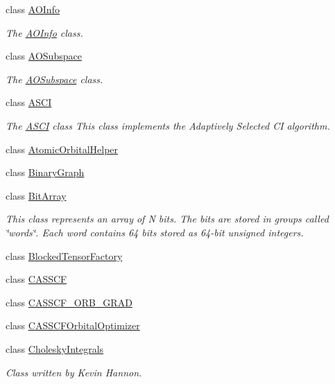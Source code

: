 \begin{DoxyCompactItemize}
class \mbox{\hyperlink{classforte_1_1_a_o_info}{A\+O\+Info}}
\begin{DoxyCompactList}\small\item\em The \mbox{\hyperlink{classforte_1_1_a_o_info}{A\+O\+Info}} class. \end{DoxyCompactList}\item 
class \mbox{\hyperlink{classforte_1_1_a_o_subspace}{A\+O\+Subspace}}
\begin{DoxyCompactList}\small\item\em The \mbox{\hyperlink{classforte_1_1_a_o_subspace}{A\+O\+Subspace}} class. \end{DoxyCompactList}\item 
class \mbox{\hyperlink{classforte_1_1_a_s_c_i}{A\+S\+CI}}
\begin{DoxyCompactList}\small\item\em The \mbox{\hyperlink{classforte_1_1_a_s_c_i}{A\+S\+CI}} class This class implements the Adaptively Selected CI algorithm. \end{DoxyCompactList}\item 
class \mbox{\hyperlink{classforte_1_1_atomic_orbital_helper}{Atomic\+Orbital\+Helper}}
\item 
class \mbox{\hyperlink{classforte_1_1_binary_graph}{Binary\+Graph}}
\item 
class \mbox{\hyperlink{classforte_1_1_bit_array}{Bit\+Array}}
\begin{DoxyCompactList}\small\item\em This class represents an array of N bits. The bits are stored in groups called \char`\"{}words\char`\"{}. Each word contains 64 bits stored as 64-\/bit unsigned integers. \end{DoxyCompactList}\item 
class \mbox{\hyperlink{classforte_1_1_blocked_tensor_factory}{Blocked\+Tensor\+Factory}}
\item 
class \mbox{\hyperlink{classforte_1_1_c_a_s_s_c_f}{C\+A\+S\+S\+CF}}
\item 
class \mbox{\hyperlink{classforte_1_1_c_a_s_s_c_f___o_r_b___g_r_a_d}{C\+A\+S\+S\+C\+F\+\_\+\+O\+R\+B\+\_\+\+G\+R\+AD}}
\item 
class \mbox{\hyperlink{classforte_1_1_c_a_s_s_c_f_orbital_optimizer}{C\+A\+S\+S\+C\+F\+Orbital\+Optimizer}}
\item 
class \mbox{\hyperlink{classforte_1_1_cholesky_integrals}{Cholesky\+Integrals}}
\begin{DoxyCompactList}\small\item\em Class written by Kevin Hannon. \end{DoxyCompactList}\item 

\end{DoxyCompactItemize}
